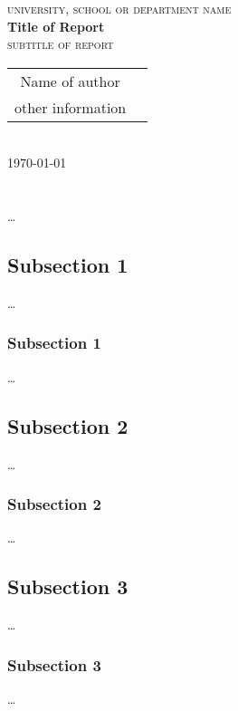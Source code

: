 \documentclass[10pt, a4paper, oneside]{report}
\begin{document}
\thispagestyle{empty}
\begin{center}
  \textsc{university, school or department name} \\ [60pt] 

  \textbf{{\LARGE Title of Report}} \\ [1pt]
  \textsc{{\large subtitle of report }} \\ [20pt]

  \begin{tabular}{cc}
    Name of author  \\
    other information
  \end{tabular} \\ [20pt]
  \today \\
\end{center}
\newpage

\begin{abstract}

\end{abstract}

\newpage

\tableofcontents

\newpage

\chapter{}
\ldots
\section{Subsection 1}
\ldots
\subsection{Subsection 1}
\ldots

\section{Subsection 2}
\ldots
\subsection{Subsection 2}
\ldots

\section{Subsection 3}
\ldots
\subsection{Subsection 3}
\ldots
\end{document}
